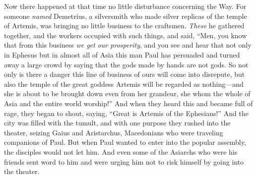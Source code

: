 \begin{biblechapter}
\verse Now there happened at that time no little disturbance concerning the Way.
\verse For someone \textit{named} Demetrius, a silversmith who made silver replicas of the temple of Artemis, was bringing no little business to the craftsmen.
\verse \textit{These} he gathered together, and the workers occupied with such things, and said, “Men, you know that from this business \textit{we get our prosperity},
\verse and you see and hear that not only in Ephesus but in almost all of Asia this man Paul has persuaded and turned away a large crowd by saying that the gods made by hands are not gods.
\verse So not only is there a danger this line of business of ours will come into disrepute, but also the temple of the great goddess Artemis will be regarded as nothing—and she is about to be brought down even from her grandeur, she whom the whole of Asia and the entire world worship!”
\verse And when they heard this and became full of rage, they began to shout, saying, “Great is Artemis of the Ephesians!”
\verse And the city was filled with the tumult, and with one purpose they rushed into the theater, seizing Gaius and Aristarchus, Macedonians who were traveling companions of Paul.
\verse But when Paul wanted to enter into the popular assembly, the disciples would not let him.
\verse And even some of the Asiarchs who were his friends sent word to him and were urging him not to risk himself by going into the theater.

\end{biblechapter}
